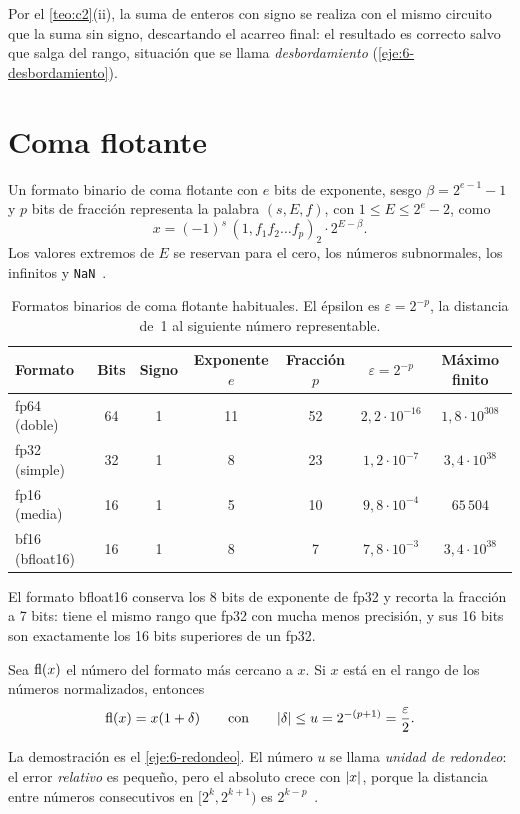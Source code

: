 \addtocounter{definicion}{1}%

Por el \cref{teo:c2}(ii), la suma de enteros con signo se realiza con el mismo circuito que la suma sin signo, descartando el acarreo final: el resultado es correcto salvo que salga del rango, situación que se llama \emph{desbordamiento} (\cref{eje:6-desbordamiento}).

\section{Coma flotante}

\begin{definicion}\label{def:flotante}
Un formato binario de coma flotante con $e$ bits de exponente, sesgo $\beta=2^{e-1}-1$ y $p$ bits de fracción representa la palabra $(s,E,f)$, con $1\le E\le2^e-2$, como
\[
x=(-1)^s\,(1{,}f_1f_2\dots f_p)_2\cdot2^{E-\beta}.
\]
Los valores extremos de $E$ se reservan para el cero, los números subnormales, los infinitos y \texttt{NaN}~\cite{ieee754}.
\end{definicion}

\begin{table}[h]
\centering\small
\caption{Formatos binarios de coma flotante habituales. El épsilon es $\varepsilon=2^{-p}$, la distancia de~1 al siguiente número representable.}\label{tab:formatos}
\begin{tabular}{@{}lcccccc@{}}
\toprule
Formato & Bits & Signo & Exponente $e$ & Fracción $p$ & $\varepsilon=2^{-p}$ & Máximo finito \\
\midrule
fp64 (doble) & 64 & 1 & 11 & 52 & $2{,}2\cdot10^{-16}$ & $1{,}8\cdot10^{308}$ \\
fp32 (simple) & 32 & 1 & 8 & 23 & $1{,}2\cdot10^{-7}$ & $3{,}4\cdot10^{38}$ \\
fp16 (media) & 16 & 1 & 5 & 10 & $9{,}8\cdot10^{-4}$ & $65\,504$ \\
bf16 (bfloat16) & 16 & 1 & 8 & 7 & $7{,}8\cdot10^{-3}$ & $3{,}4\cdot10^{38}$ \\
\bottomrule
\end{tabular}
\end{table}

El formato bfloat16 conserva los 8 bits de exponente de fp32 y recorta la fracción a 7 bits: tiene el mismo rango que fp32 con mucha menos precisión, y sus 16 bits son exactamente los 16 bits superiores de un fp32.

\begin{proposicion}\label{prop:redondeo}
Sea $\operatorname{fl}(x)$ el número del formato más cercano a $x$. Si $x$ está en el rango de los números normalizados, entonces
\[
\operatorname{fl}(x)=x(1+\delta)\qquad\text{con}\qquad\lvert\delta\rvert\le u=2^{-(p+1)}=\frac\varepsilon2.
\]
\end{proposicion}

La demostración es el \cref{eje:6-redondeo}. El número $u$ se llama \emph{unidad de redondeo}: el error \emph{relativo} es pequeño, pero el absoluto crece con $\lvert x\rvert$, porque la distancia entre números consecutivos en $[2^k,2^{k+1})$ es $2^{k-p}$~\cite{goldberg}.

\addtocounter{definicion}{1}%

\addtocounter{definicion}{1}%

